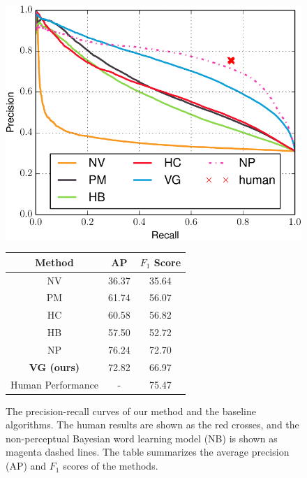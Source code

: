 \begin{figure}
    \centering
    \parbox{0.35\textwidth}{
    \includegraphics[width=1\linewidth]{figs/vcl/pr_curve.pdf}}\hspace{0.05\textwidth}%
    \parbox{0.4\textwidth}{
        \small
        \begin{tabular}{c|cc}
            \hline\hline
            Method & AP & $F_1$ Score \\
            \hline
            NV & 36.37 & 35.64 \\
            PM & 61.74 & 56.07 \\
            HC & 60.58 & 56.82 \\
            HB & 57.50 & 52.72 \\
            NP & 76.24 & 72.70 \\
            {\bfseries VG (ours)} & 72.82 & 66.97 \\
            \hline
            Human Performance & - & 75.47 \\
            \hline
        \end{tabular}
    }
    \caption{The precision-recall curves of our method and the baseline algorithms. The human results are shown as the red crosses, and the non-perceptual Bayesian word learning model (NB) is shown as magenta dashed lines. The table summarizes the average precision (AP) and $F_1$ scores of the methods.}\label{fig:prcurve}
\end{figure}

